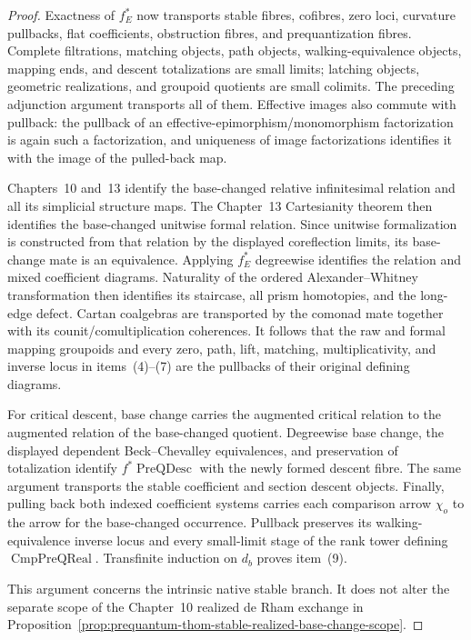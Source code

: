 \begin{proof}
Exactness of $f_E^*$ now transports stable fibres, cofibres, zero loci, curvature
pullbacks, flat coefficients, obstruction fibres, and prequantization fibres.
Complete filtrations, matching objects, path objects, walking-equivalence
objects, mapping ends, and descent totalizations are small limits; latching
objects, geometric realizations, and groupoid quotients are small colimits.
The preceding adjunction argument transports all of them.  Effective images
also commute with pullback: the pullback of an effective-epimorphism/monomorphism
factorization is again such a factorization, and uniqueness of image
factorizations identifies it with the image of the pulled-back map.

Chapters~10 and~13 identify the base-changed relative infinitesimal relation and
all its simplicial structure maps.  The Chapter~13 Cartesianity theorem then
identifies the base-changed unitwise formal relation.  Since unitwise
formalization is constructed from that relation by the displayed coreflection
limits, its base-change mate is an equivalence.  Applying $f_E^*$ degreewise
identifies the relation and mixed coefficient
diagrams.  Naturality of the ordered Alexander--Whitney transformation then
identifies its staircase, all prism homotopies, and the long-edge defect.
Cartan coalgebras are transported by the comonad mate together with its
counit/comultiplication coherences.  It follows that the raw and formal mapping
groupoids and every zero, path, lift, matching, multiplicativity, and inverse
locus in items~(4)--(7) are the pullbacks of their original defining diagrams.

For critical descent, base change carries the augmented critical relation to the
augmented relation of the base-changed quotient.  Degreewise base change, the
displayed dependent Beck--Chevalley equivalences, and preservation of
totalization identify $f^*\operatorname{PreQDesc}$ with the newly formed descent
fibre.  The same argument transports the stable coefficient and section descent
objects.  Finally, pulling back both indexed coefficient systems carries each
comparison arrow $\chi_o$ to the arrow for the base-changed occurrence.
Pullback preserves its walking-equivalence inverse locus and every small-limit
stage of the rank tower defining $\operatorname{CmpPreQReal}$.  Transfinite
induction on $d_b$ proves item~(9).

This argument concerns the intrinsic native stable branch.  It does not alter
the separate scope of the Chapter~10 realized de Rham exchange in
Proposition~\ref{prop:prequantum-thom-stable-realized-base-change-scope}.
\end{proof}

